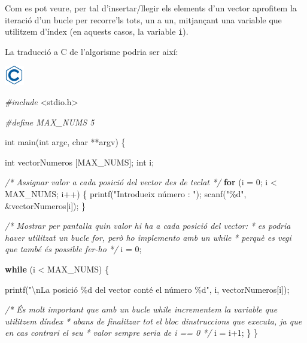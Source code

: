 \documentclass[]{book}
\newenvironment{Shaded}{\begin{snugshade}}{\end{snugshade}}
\newcommand{\CommentTok}[1]{\textcolor[rgb]{0.56,0.35,0.01}{\textit{#1}}}
\newcommand{\ControlFlowTok}[1]{\textcolor[rgb]{0.13,0.29,0.53}{\textbf{#1}}}
\newcommand{\DataTypeTok}[1]{\textcolor[rgb]{0.13,0.29,0.53}{#1}}
\newcommand{\DecValTok}[1]{\textcolor[rgb]{0.00,0.00,0.81}{#1}}
\newcommand{\ImportTok}[1]{#1}
\newcommand{\NormalTok}[1]{#1}
\newcommand{\PreprocessorTok}[1]{\textcolor[rgb]{0.56,0.35,0.01}{\textit{#1}}}
\newcommand{\SpecialCharTok}[1]{\textcolor[rgb]{0.00,0.00,0.00}{#1}}
\newcommand{\StringTok}[1]{\textcolor[rgb]{0.31,0.60,0.02}{#1}}
\begin{document}
Com es pot veure, per tal d'insertar/llegir els elements d'un vector aprofitem la iteració d'un bucle per recorre'ls tots, un a un, mitjançant una variable que utilitzem d'índex (en aquests casos, la variable \texttt{i}).

La traducció a C de l'algorisme podria ser així:

\includegraphics{./img/c.png}

\begin{Shaded}
\begin{Highlighting}[]
\PreprocessorTok{\#include }\ImportTok{\textless{}stdio.h\textgreater{}}

\PreprocessorTok{\#define MAX\_NUMS 5}

\DataTypeTok{int}\NormalTok{ main(}\DataTypeTok{int}\NormalTok{ argc, }\DataTypeTok{char}\NormalTok{ **argv) \{}

    \DataTypeTok{int}\NormalTok{ vectorNumeros [MAX\_NUMS];}
    \DataTypeTok{int}\NormalTok{ i;}

    \CommentTok{/* Assignar valor a cada posició del vector des de teclat */}
    \ControlFlowTok{for}\NormalTok{ (i = }\DecValTok{0}\NormalTok{; i \textless{} MAX\_NUMS; i++) \{}
\NormalTok{        printf(}\StringTok{"Introdueix número : "}\NormalTok{);}
\NormalTok{        scanf(}\StringTok{"\%d"}\NormalTok{, \&vectorNumeros[i]);}
\NormalTok{    \}}

    \CommentTok{/* Mostrar per pantalla quin valor hi ha a cada posició del vector:}
\CommentTok{     * es podria haver utilitzat un bucle for, però ho implemento amb un while}
\CommentTok{     * perquè es vegi que també és possible fer{-}ho }
\CommentTok{     */}
\NormalTok{    i = }\DecValTok{0}\NormalTok{;}

     \ControlFlowTok{while}\NormalTok{ (i \textless{} MAX\_NUMS) \{}

\NormalTok{      printf(}\StringTok{"}\SpecialCharTok{\textbackslash{}n}\StringTok{La posició \%d del vector conté el número \%d"}\NormalTok{, i, vectorNumeros[i]);}

      \CommentTok{/* És molt important que amb un bucle while incrementem la variable que utilitzem d\textquotesingle{}índex}
\CommentTok{       * abans de finalitzar tot el bloc d\textquotesingle{}instruccions que executa, ja que en cas contrari el seu}
\CommentTok{       * valor sempre seria de i == 0 }
\CommentTok{       */}
\NormalTok{      i = i+}\DecValTok{1}\NormalTok{;}
\NormalTok{   \}}
\NormalTok{\}}
\end{Highlighting}
\end{Shaded}
\end{document}
